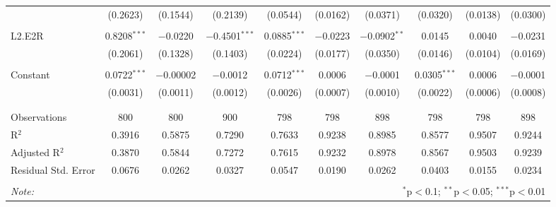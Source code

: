 \begin{table}[!htbp]
\begin{tabular}{@{\extracolsep{5pt}}lccccccccc}
  & (0.2623) & (0.1544) & (0.2139) & (0.0544) & (0.0162) & (0.0371) & (0.0320) & (0.0138) & (0.0300) \\ 
  & & & & & & & & & \\ 
 L2.E2R & 0.8208$^{***}$ & $-$0.0220 & $-$0.4501$^{***}$ & 0.0885$^{***}$ & $-$0.0223 & $-$0.0902$^{**}$ & 0.0145 & 0.0040 & $-$0.0231 \\ 
  & (0.2061) & (0.1328) & (0.1403) & (0.0224) & (0.0177) & (0.0350) & (0.0146) & (0.0104) & (0.0169) \\ 
  & & & & & & & & & \\ 
 Constant & 0.0722$^{***}$ & $-$0.00002 & $-$0.0012 & 0.0712$^{***}$ & 0.0006 & $-$0.0001 & 0.0305$^{***}$ & 0.0006 & $-$0.0001 \\ 
  & (0.0031) & (0.0011) & (0.0012) & (0.0026) & (0.0007) & (0.0010) & (0.0022) & (0.0006) & (0.0008) \\ 
  & & & & & & & & & \\ 
\hline \\[-1.8ex] 
Observations & 800 & 800 & 900 & 798 & 798 & 898 & 798 & 798 & 898 \\ 
R$^{2}$ & 0.3916 & 0.5875 & 0.7290 & 0.7633 & 0.9238 & 0.8985 & 0.8577 & 0.9507 & 0.9244 \\ 
Adjusted R$^{2}$ & 0.3870 & 0.5844 & 0.7272 & 0.7615 & 0.9232 & 0.8978 & 0.8567 & 0.9503 & 0.9239 \\ 
Residual Std. Error & 0.0676 & 0.0262 & 0.0327 & 0.0547 & 0.0190 & 0.0262 & 0.0403 & 0.0155 & 0.0234 \\ 
\hline 
\hline \\[-1.8ex] 
\textit{Note:}  & \multicolumn{9}{r}{$^{*}$p$<$0.1; $^{**}$p$<$0.05; $^{***}$p$<$0.01} \\ 
\end{tabular} 
\end{table} 

